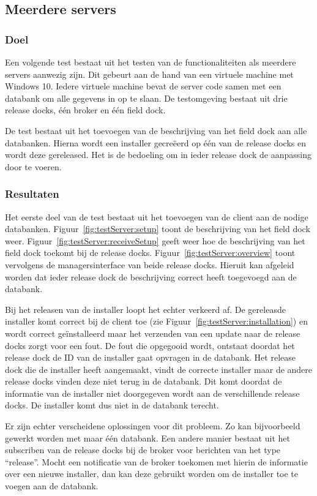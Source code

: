 \subsection{Meerdere servers}
\subsubsection{Doel}
Een volgende test bestaat uit het testen van de functionaliteiten als meerdere servers aanwezig zijn.
Dit gebeurt aan de hand van een virtuele machine met Windows 10.
Iedere virtuele machine bevat de server code samen met een databank om alle gegevens in op te slaan.
De testomgeving bestaat uit drie release docks, één broker en één field dock.

De test bestaat uit het toevoegen van de beschrijving van het field dock aan alle databanken.
Hierna wordt een installer gecreëerd op één van de release docks en wordt deze gereleased.
Het is de bedoeling om in ieder release dock de aanpassing door te voeren.

\subsubsection{Resultaten}
Het eerste deel van de test bestaat uit het toevoegen van de client aan de nodige databanken.
Figuur~\ref{fig:testServer:setup} toont de beschrijving van het field dock weer.
Figuur~\ref{fig:testServer:receiveSetup} geeft weer hoe de beschrijving van het field dock toekomt bij de release docks.
Figuur~\ref{fig:testServer:overview} toont vervolgens de managersinterface van beide release docks.
Hieruit kan afgeleid worden dat ieder release dock de beschrijving correct heeft toegevoegd aan de databank.

Bij het releasen van de installer loopt het echter verkeerd af.
De gereleasde installer komt correct bij de client toe (zie Figuur~\ref{fig:testServer:installation}) en wordt correct geïnstalleerd  maar het verzenden van een update naar de release docks zorgt voor een fout.
De fout die opgegooid wordt, ontstaat doordat het release dock de ID van de installer gaat opvragen in de databank.
Het release dock die de installer heeft aangemaakt, vindt de correcte installer maar de andere release docks vinden deze niet terug in de databank.
Dit komt doordat de informatie van de installer niet doorgegeven wordt aan de verschillende release docks.
De installer komt dus niet in de databank terecht.

Er zijn echter verscheidene oplossingen voor dit probleem.
Zo kan bijvoorbeeld gewerkt worden met maar één databank.
Een andere manier bestaat uit het subscriben van de release docks bij de broker voor berichten van het type ``release''.
Mocht een notificatie van de broker toekomen met hierin de informatie over een nieuwe installer, dan kan deze gebruikt worden om de installer toe te voegen aan de databank.

